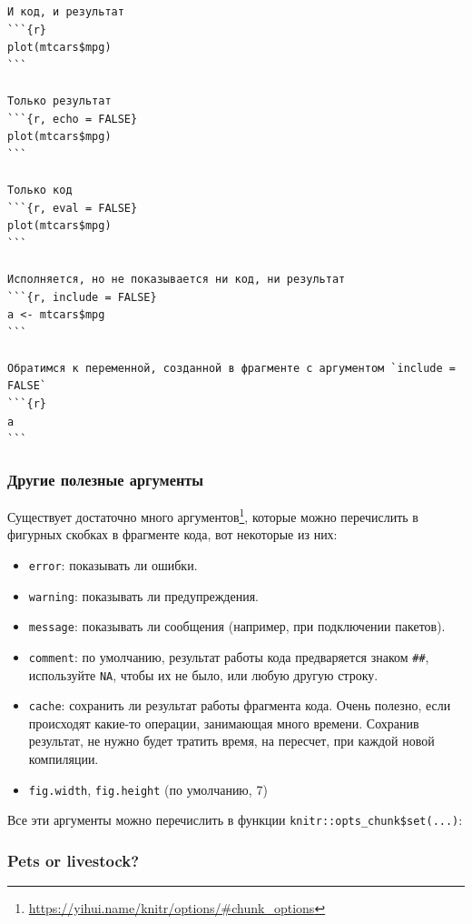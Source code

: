 \documentclass[
]{book}
\providecommand{\tightlist}{%
  \setlength{\itemsep}{0pt}\setlength{\parskip}{0pt}}
\renewcommand{\href}[2]{#2\footnote{\url{#1}}}
\begin{document}
\begin{verbatim}
И код, и результат
```{r}
plot(mtcars$mpg)
```

Только результат
```{r, echo = FALSE}
plot(mtcars$mpg)
```

Только код
```{r, eval = FALSE}
plot(mtcars$mpg)
```

Исполняется, но не показывается ни код, ни результат
```{r, include = FALSE}
a <- mtcars$mpg
```

Обратимся к переменной, созданной в фрагменте с аргументом `include = FALSE`
```{r}
a
```
\end{verbatim}

\hypertarget{ux434ux440ux443ux433ux438ux435-ux43fux43eux43bux435ux437ux43dux44bux435-ux430ux440ux433ux443ux43cux435ux43dux442ux44b}{%
\subsubsection{Другие полезные аргументы}\label{ux434ux440ux443ux433ux438ux435-ux43fux43eux43bux435ux437ux43dux44bux435-ux430ux440ux433ux443ux43cux435ux43dux442ux44b}}

Существует достаточно \href{https://yihui.name/knitr/options/\#chunk_options}{много аргументов}, которые можно перечислить в фигурных скобках в фрагменте кода, вот некоторые из них:

\begin{itemize}
\tightlist
\item
  \texttt{error}: показывать ли ошибки.
\item
  \texttt{warning}: показывать ли предупреждения.
\item
  \texttt{message}: показывать ли сообщения (например, при подключении пакетов).
\item
  \texttt{comment}: по умолчанию, результат работы кода предваряется знаком \texttt{\#\#}, используйте \texttt{NA}, чтобы их не было, или любую другую строку.
\item
  \texttt{cache}: сохранить ли результат работы фрагмента кода. Очень полезно, если происходят какие-то операции, занимающая много времени. Сохранив результат, не нужно будет тратить время, на пересчет, при каждой новой компиляции.
\item
  \texttt{fig.width}, \texttt{fig.height} (по умолчанию, 7)
\end{itemize}

Все эти аргументы можно перечислить в функции \texttt{knitr::opts\_chunk\$set(...)}:

\hypertarget{pets-or-livestock}{%
\subsubsection{Pets or livestock?}\label{pets-or-livestock}}
\end{document}
